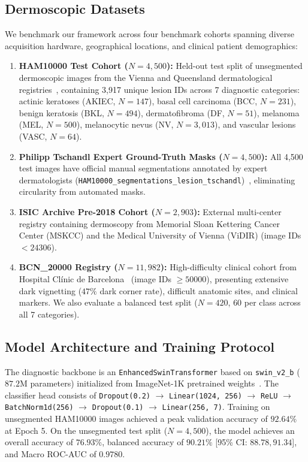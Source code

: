 \documentclass[11pt,a4paper]{article}
\begin{document}
\subsection{Dermoscopic Datasets}
We benchmark our framework across four benchmark cohorts spanning diverse acquisition hardware, geographical locations, and clinical patient demographics:
\begin{enumerate}
    \item \textbf{HAM10000 Test Cohort ($N=4,500$):} Held-out test split of unsegmented dermoscopic images from the Vienna and Queensland dermatological registries~\cite{tschandl2018ham10000}, containing 3,917 unique lesion IDs across 7 diagnostic categories: actinic keratoses (AKIEC, $N=147$), basal cell carcinoma (BCC, $N=231$), benign keratosis (BKL, $N=494$), dermatofibroma (DF, $N=51$), melanoma (MEL, $N=500$), melanocytic nevus (NV, $N=3,013$), and vascular lesions (VASC, $N=64$).
    \item \textbf{Philipp Tschandl Expert Ground-Truth Masks ($N=4,500$):} All 4,500 test images have official manual segmentations annotated by expert dermatologists (\texttt{HAM10000\_segmentations\_}\linebreak[0]\texttt{lesion\_tschandl})~\cite{tschandl2020human}, eliminating circularity from automated masks.
    \item \textbf{ISIC Archive Pre-2018 Cohort ($N=2,903$):} External multi-center registry containing dermoscopy from Memorial Sloan Kettering Cancer Center (MSKCC) and the Medical University of Vienna (ViDIR) (image IDs $< 24306$).
    \item \textbf{BCN\_20000 Registry ($N=11,982$):} High-difficulty clinical cohort from Hospital Cl{\'i}nic de Barcelona~\cite{combalia2022bcn20000} (image IDs $\ge 50000$), presenting extensive dark vignetting ($47\%$ dark corner rate), difficult anatomic sites, and clinical markers. We also evaluate a balanced test split ($N=420$, $60$ per class across all 7 categories).
\end{enumerate}

\subsection{Model Architecture and Training Protocol}
The diagnostic backbone is an \texttt{EnhancedSwinTransformer} based on \texttt{swin\_v2\_b} ($87.2\text{M}$ parameters) initialized from ImageNet-1K pretrained weights~\cite{liu2022swinv2}. The classifier head consists of \texttt{Dropout(0.2)} $\rightarrow$ \texttt{Linear(1024, 256)} $\rightarrow$ \texttt{ReLU} $\rightarrow$ \texttt{BatchNorm1d(256)} $\rightarrow$ \texttt{Dropout(0.1)} $\rightarrow$ \texttt{Linear(256, 7)}. Training on unsegmented HAM10000 images achieved a peak validation accuracy of $92.64\%$ at Epoch 5. On the unsegmented test split ($N=4,500$), the model achieves an overall accuracy of $76.93\%$, balanced accuracy of $90.21\%$ [95\% CI: $88.78, 91.34$], and Macro ROC-AUC of $0.9780$.
\end{document}
